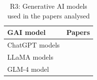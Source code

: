 \begin{table}[htb]
\centering
\small
\renewcommand{\arraystretch}{0.9} %
\setlength{\tabcolsep}{4pt}
\begin{tabular}{p{6cm} p{8cm}}
  \toprule
  \textbf{GAI model} & \textbf{Papers} \\ 
  \midrule
  ChatGPT models & \cite{5ferrari2024,7eisenreich2024,9ruan2023,10chen2023,11omar2023,12li2024,14chaaben2023,1deBari2024,2babaalla2024,3ahmad2023,4jahan2024,6wang2024} \\ 
  \midrule
  LLaMA models &  \cite{7eisenreich2024,13benardi2024,2babaalla2024}\\
  \midrule 
  GLM-4 model &  \cite{8z_wang2024}\\
\end{tabular}
\caption{R3: Generative AI models used in the papers analysed}
\label{tab:GAI_models_most_used}
\end{table}


